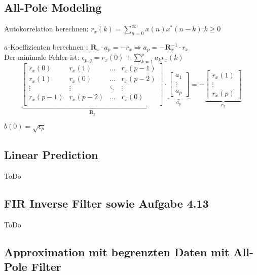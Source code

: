 \newpage
\subsection{All-Pole Modeling }
\begin{aufzaehlung}
	\item Autokorrelation berechnen: $ r_x(k) = \sum\limits_{n=0}^\infty x(n)x^*(n-k)$;\qquad $k\geq 0$
	\item $a$-Koeffizienten berechnen : $\bm R_x \cdot a_p = -r_x \Longrightarrow a_p = - \bm R_x^{-1} \cdot r_x$ 
  		 \small\\
		Der minimale Fehler ist: $\epsilon_{p,q} = r_x(0) + \sum\limits_{k=1}^p a_k r_x(k)$
			$$
		\underbrace{\begin{bmatrix}
    		r_x(0) & r_x(1) & \hdots & r_x(p-1) \\                                   
    		r_x(1) & r_x(0) & \hdots & r_x(p-2) \\
    		\vdots & \vdots & \ddots & \vdots \\                             
    		r_x(p-1) & r_x(p-2) & \hdots & r_x(0) \\                        
		\end{bmatrix}  }_{\bm R_x} \cdot 
		\underbrace{\begin{bmatrix}
    		a_1 \\
    		\vdots \\
    		a_p
		\end{bmatrix}  }_{a_p}= -\underbrace{\begin{bmatrix}
    		r_x(1) \\
    		\vdots \\
    		r_x(p)
		\end{bmatrix}  }_{r_x}$$ 
	\item $b(0) = \sqrt{\epsilon_p}$ 
		\normalsize
\end{aufzaehlung}

\subsection{Linear Prediction }
ToDo

\subsection{FIR Inverse Filter  sowie Aufgabe 4.13}
ToDo

\clearpage
\subsection{Approximation mit begrenzten  Daten mit All-Pole Filter}
